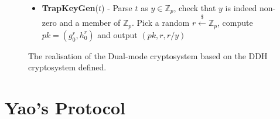 \documentclass[ %
                    author={Nicholas Tutte},
                supervisor={Prof. Nigel Smart},
                    degree={MEng},
                     title={Secure Two Party Computation},
                  subtitle={A practical comparison of recent protocols},
                      type={Research - GG1K},
                      year={2015} ]{dissertation}
\begin{document}
\begin{figure}[!htb]
\begin{mdframed}
\begin{itemize}
								\item \textbf{TrapKeyGen}($t$) - Parse $t$ as $y \in \mathbb{Z}_p$, check that $y$ is indeed non-zero and a member of $\mathbb{Z}_p$. Pick a random $r \xleftarrow{\$} \mathbb{Z}_p$, compute $pk = (g_0^r, h_0^r)$ and output $(pk, r, r / y)$
							\end{itemize}
						\end{mdframed}

						\caption{The realisation of the Dual-mode cryptosystem based on the DDH cryptosystem defined. \label{fig:PVW_DDH_Concrete_Functions}}
					\end{figure}
% 
% 
% 					
% 


	\section{Yao's Protocol} \label{sec:Yao_Circuits}
\end{document}
